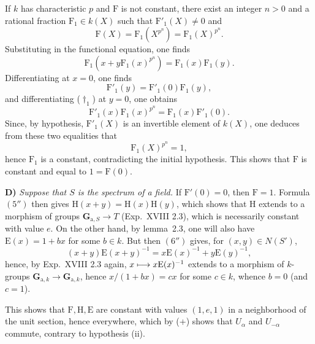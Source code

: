 If $k$ has characteristic $p$ and $\mathrm F$ is not constant,{\renewcommand{\thefootnote}{(18)}} there exist an integer $n>0$ and a rational fraction $\mathrm F_1\in k(X)$ such that $\mathrm F'_1(X)\ne0$ and
\[
\mathrm F(X)=\mathrm F_1(X^{p^n})=\mathrm F_1(X)^{p^n}.
\]
Substituting in the functional equation, one finds
\begin{equation}\tag{$\dagger_1$}\label{XX.eq.dagger1}
\mathrm F_1(x+y\mathrm F_1(x)^{p^n})=\mathrm F_1(x)\mathrm F_1(y).
\end{equation}
Differentiating at $x=0$, one finds
\begin{equation}\tag{$*_1$}\label{XX.eq.star1}
\mathrm F'_1(y)=\mathrm F'_1(0)\mathrm F_1(y),
\end{equation}
and differentiating ($\dagger_1$) at $y=0$, one obtains
\begin{equation}\tag{$*'_1$}\label{XX.eq.starprime1}
\mathrm F'_1(x)\mathrm F_1(x)^{p^n}=\mathrm F_1(x)\mathrm F'_1(0).
\end{equation}
Since, by hypothesis, $\mathrm F'_1(X)$ is an invertible element of $k(X)$, one deduces from these two equalities that
\[
\mathrm F_1(X)^{p^n}=1,
\]
hence $\mathrm F_1$ is a constant, contradicting the initial hypothesis. This shows that $\mathrm F$ is constant and equal to $1=\mathrm F(0)$.

\textbf{D)} \emph{Suppose that $S$ is the spectrum of a field.} If $\mathrm F'(0)=0$, then $\mathrm F=1$. Formula $(5'')$ then gives $\mathrm H(x+y)=\mathrm H(x)\mathrm H(y)$, which shows that $\mathrm H$ extends to a morphism of groups $\mathbf G_{\mathrm a,S}\to T$ (Exp.~XVIII 2.3), which is necessarily constant with value $e$. On the other hand, by lemma~2.3, one will also have $\mathrm E(x)=1+bx$ for some $b\in k$. But then $(6'')$ gives, for $(x,y)\in N(S')$,
\[
(x+y)\mathrm E(x+y)^{-1}=x\mathrm E(x)^{-1}+y\mathrm E(y)^{-1},
\]
hence,{\renewcommand{\thefootnote}{(19)}} by Exp.~XVIII 2.3 again, $x\longmapsto x\mathrm E(x)^{-1}$ extends to a morphism of $k$-groups $\mathbf G_{\mathrm a,k}\to\mathbf G_{\mathrm a,k}$, hence $x/(1+bx)=cx$ for some $c\in k$, whence $b=0$ (and $c=1$).

This shows that $\mathrm F,\mathrm H,\mathrm E$ are constant with values $(1,e,1)$ in a neighborhood of the unit section, hence everywhere, which by (+) shows that $U_\alpha$ and $U_{-\alpha}$ commute, contrary to hypothesis (ii).

